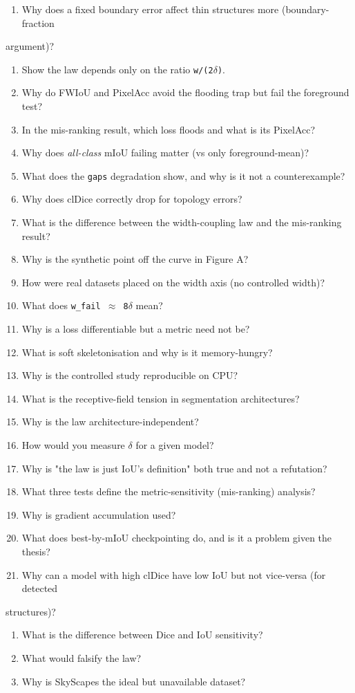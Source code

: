 \documentclass[11pt]{article}
\begin{document}
\begin{enumerate}\setlength{\itemsep}{1pt}
\item Why does a fixed boundary error affect thin structures more (boundary-fraction
\end{enumerate}
    argument)?
\begin{enumerate}\setlength{\itemsep}{1pt}
\item Show the law depends only on the ratio \texttt{w/(2$\delta$)}.
\item Why do FWIoU and PixelAcc avoid the flooding trap but fail the foreground test?
\item In the mis-ranking result, which loss floods and what is its PixelAcc?
\item Why does \textit{all-class} mIoU failing matter (vs only foreground-mean)?
\item What does the \texttt{gaps} degradation show, and why is it not a counterexample?
\item Why does clDice correctly drop for topology errors?
\item What is the difference between the width-coupling law and the mis-ranking result?
\item Why is the synthetic point off the curve in Figure A?
\item How were real datasets placed on the width axis (no controlled width)?
\item What does \texttt{w\_fail $\approx$ 8$\delta$} mean?
\item Why is a loss differentiable but a metric need not be?
\item What is soft skeletonisation and why is it memory-hungry?
\item Why is the controlled study reproducible on CPU?
\item What is the receptive-field tension in segmentation architectures?
\item Why is the law architecture-independent?
\item How would you measure \texttt{$\delta$} for a given model?
\item Why is "the law is just IoU's definition" both true and not a refutation?
\item What three tests define the metric-sensitivity (mis-ranking) analysis?
\item Why is gradient accumulation used?
\item What does best-by-mIoU checkpointing do, and is it a problem given the thesis?
\item Why can a model with high clDice have low IoU but not vice-versa (for detected
\end{enumerate}
    structures)?
\begin{enumerate}\setlength{\itemsep}{1pt}
\item What is the difference between Dice and IoU sensitivity?
\item What would falsify the law?
\item Why is SkyScapes the ideal but unavailable dataset?
\end{enumerate}
\end{document}
